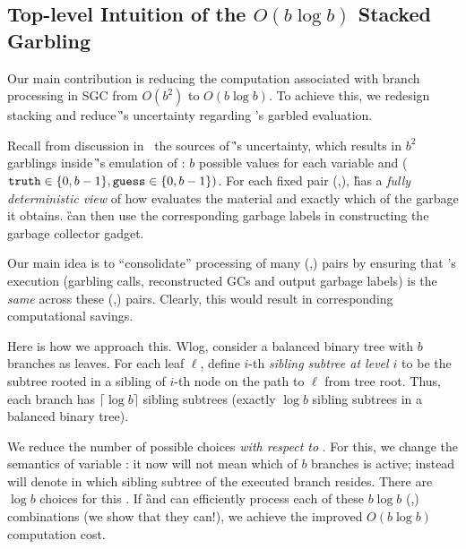 
\subsection{Top-level Intuition of the $O(b \log b)$ Stacked Garbling}
\label{sec:intuition}

Our main contribution is reducing the computation associated with branch processing in SGC from $O(b^2)$ to $O(b \log b)$.
To achieve this, we redesign stacking and reduce \G's uncertainty regarding \E's garbled evaluation.  

 
   Recall from discussion in~ the  sources of \G's uncertainty, which results in $b^2$ garblings inside \G's emulation of \E: $b$ possible values for each variable \truth and \guess ($\mathtt{truth} \in\{0,b-1\}, \mathtt{guess}\in\{0,b-1\})$.
   For each fixed pair  (\truth,\guess), \G has a {\em fully deterministic view} of how \E evaluates the material and exactly which of the garbage it obtains.  \G can then use the corresponding garbage labels in constructing the garbage collector gadget.
   
   Our main idea  is to ``consolidate''  processing of many (\truth,\guess) pairs by ensuring that \E's execution (garbling calls, reconstructed GCs and output garbage labels) is the {\em same} across these (\truth,\guess) pairs.  Clearly, this would result in corresponding computational savings. 
   

  
  Here is how we approach this.  Wlog, consider a balanced binary tree with $b$ branches as leaves. 
  For each leaf $\ell$, define $i$-th {\em sibling subtree at level $i$} to be the subtree rooted in a sibling of $i$-th node on the path to $\ell$ from tree root.  Thus, each branch has $\lceil \log b \rceil$ sibling subtrees (exactly $\log b$ sibling subtrees in a balanced binary tree).
  
    
 We reduce the number of possible \truth choices  {\em with respect to  \guess}.  For this, we  change the semantics of variable \truth: it now will not mean which of $b$ branches is active; instead \truth will denote in which sibling subtree of \guess the executed branch resides.  There are $\log b$ choices for this \truth.  If \G and \E can efficiently process each of these $b\log b$  (\truth,\guess) combinations  (we show that they can!), we achieve the improved $O(b\log b)$ computation cost.
  
  
  
 

